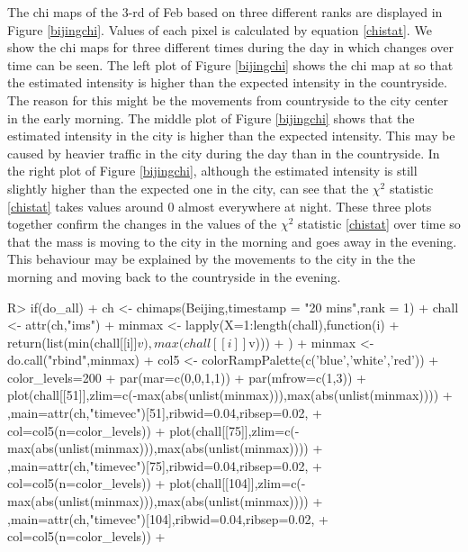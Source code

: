 \documentclass[article]{jss}
\begin{document}
  The chi maps of the $3$-rd of Feb based on three different ranks are displayed in Figure \ref{bijingchi}. Values of each pixel is calculated by equation \eqref{chistat}.  We show the chi maps for three different times during the day in which changes over time can be seen. The left plot of Figure \ref{bijingchi} shows the chi map at  so that the estimated intensity is higher than the expected intensity in the countryside. The reason for this might be the movements from countryside to the city center in the early morning. The middle plot of Figure \ref{bijingchi} shows that the estimated intensity in the city is higher than the expected intensity. This may be caused  by heavier traffic in the city during the day than in the countryside. In the right plot of Figure \ref{bijingchi}, although the estimated intensity is still slightly higher than the expected one in the city, can see that the $\chi^2$ statistic \eqref{chistat} takes values around $0$ almost everywhere at night. These three plots together confirm the changes in the values of the $\chi^2$ statistic \eqref{chistat} over time so that the mass is moving to the city in the morning and goes away in the evening. This behaviour may be explained by the movements to the city in the the morning and moving back to the countryside in the evening.

\begin{Schunk}
\begin{Sinput}
R>  if(do_all){
+  ch <- chimaps(Beijing,timestamp = "20 mins",rank = 1)
+   chall <- attr(ch,"ims")
+   minmax <- lapply(X=1:length(chall),function(i){
+       return(list(min(chall[[i]]$v),max(chall[[i]]$v)))
+     })
+   minmax <- do.call("rbind",minmax)
+   col5 <- colorRampPalette(c('blue','white','red'))
+   color_levels=200 
+   par(mar=c(0,0,1,1))
+   par(mfrow=c(1,3))
+   plot(chall[[51]],zlim=c(-max(abs(unlist(minmax))),max(abs(unlist(minmax))))
+             ,main=attr(ch,"timevec")[51],ribwid=0.04,ribsep=0.02,
+             col=col5(n=color_levels))
+   plot(chall[[75]],zlim=c(-max(abs(unlist(minmax))),max(abs(unlist(minmax))))
+             ,main=attr(ch,"timevec")[75],ribwid=0.04,ribsep=0.02,
+             col=col5(n=color_levels))
+   plot(chall[[104]],zlim=c(-max(abs(unlist(minmax))),max(abs(unlist(minmax))))
+             ,main=attr(ch,"timevec")[104],ribwid=0.04,ribsep=0.02,
+             col=col5(n=color_levels))
+   }
\end{Sinput}
\end{Schunk}
\end{document}
